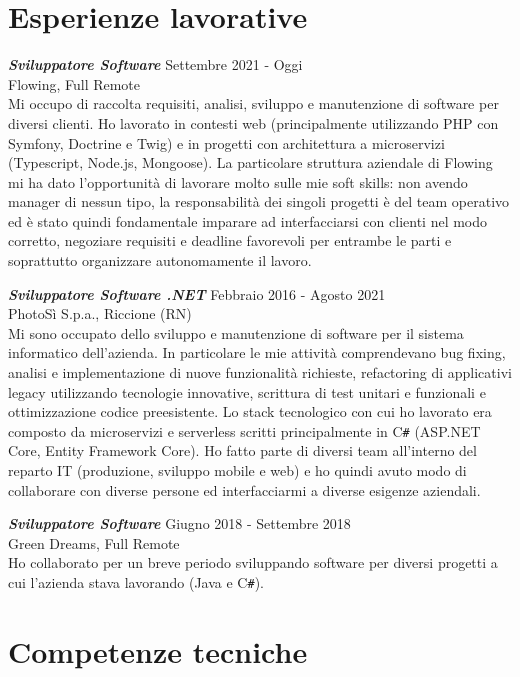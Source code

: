 \documentclass[margin, 10pt]{res} %
\begin{document}
\begin{resume}
\section{Esperienze lavorative}

{\sl \textbf{Sviluppatore Software}} \hfill Settembre 2021 - Oggi \\
Flowing, Full Remote \\
Mi occupo di raccolta requisiti, analisi, sviluppo e manutenzione di software per diversi clienti. Ho lavorato in contesti web (principalmente utilizzando PHP con Symfony, Doctrine e Twig) e in progetti con architettura a microservizi (Typescript, Node.js, Mongoose). La particolare struttura aziendale di Flowing mi ha dato l'opportunit\`a di lavorare molto sulle mie soft skills: non avendo manager di nessun tipo, la responsabilit\`a dei singoli progetti \`e del team operativo ed \`e stato quindi fondamentale imparare ad interfacciarsi con clienti nel modo corretto, negoziare requisiti e deadline favorevoli per entrambe le parti e soprattutto organizzare autonomamente il lavoro.

{\sl \textbf{Sviluppatore Software .NET}} \hfill Febbraio 2016 - Agosto 2021 \\
PhotoS\`i  S.p.a., Riccione (RN) \\
Mi sono occupato dello sviluppo e manutenzione di software per il sistema informatico dell'azienda. In particolare le mie attivit\`a comprendevano bug fixing, analisi e implementazione di nuove funzionalit\`a richieste, refactoring di applicativi legacy utilizzando tecnologie innovative, scrittura di test unitari e funzionali e ottimizzazione codice preesistente. Lo stack tecnologico con cui ho lavorato era composto da microservizi e serverless scritti principalmente in C\texttt{\#} (ASP.NET Core, Entity Framework Core). Ho fatto parte di diversi team all'interno del reparto IT (produzione, sviluppo mobile e web) e ho quindi avuto modo di collaborare con diverse persone ed interfacciarmi a diverse esigenze aziendali.

{\sl \textbf{Sviluppatore Software}} \hfill Giugno 2018 - Settembre 2018 \\
Green Dreams, Full Remote \\
Ho collaborato per un breve periodo sviluppando software per diversi progetti a cui l'azienda stava lavorando (Java e C\texttt{\#}).
\pagebreak


\section{Competenze tecniche}


\end{resume}
\end{document}
